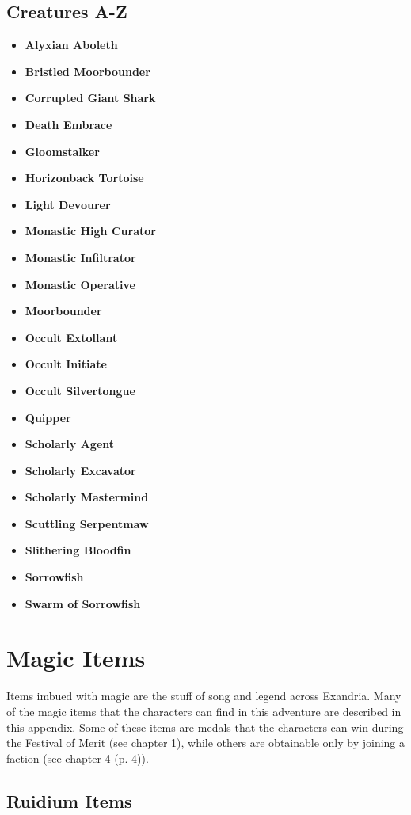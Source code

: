 \documentclass[letterpaper, 11pt, bg=full, twocolumn]{dndbook}
\begin{document}
\section{Creatures A-Z}

\begin{itemize}
\item \textbf{Alyxian Aboleth}
\item \textbf{Bristled Moorbounder}
\item \textbf{Corrupted Giant Shark}
\item \textbf{Death Embrace}
\item \textbf{Gloomstalker}
\item \textbf{Horizonback Tortoise}
\item \textbf{Light Devourer}
\item \textbf{Monastic High Curator}
\item \textbf{Monastic Infiltrator}
\item \textbf{Monastic Operative}
\item \textbf{Moorbounder}
\item \textbf{Occult Extollant}
\item \textbf{Occult Initiate}
\item \textbf{Occult Silvertongue}
\item \textbf{Quipper}
\item \textbf{Scholarly Agent}
\item \textbf{Scholarly Excavator}
\item \textbf{Scholarly Mastermind}
\item \textbf{Scuttling Serpentmaw}
\item \textbf{Slithering Bloodfin}
\item \textbf{Sorrowfish}
\item \textbf{Swarm of Sorrowfish}
\end{itemize}

\chapter{Magic Items}\label{ch:magic-items-10-10}

Items imbued with magic are the stuff of song and legend across Exandria. Many of the magic items that the characters can find in this adventure are described in this appendix. Some of these items are medals that the characters can win during the Festival of Merit (see chapter 1), while others are obtainable only by joining a faction (see chapter 4 (p. 4)).
\section{Ruidium Items}
\end{document}

